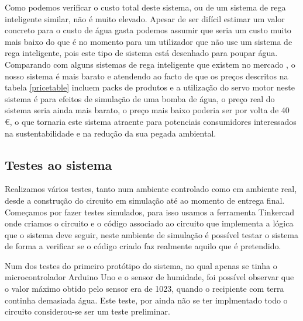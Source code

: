 \documentclass[conference]{IEEEtran}
\begin{document}
Como podemos verificar o custo total deste sistema, ou de um sistema de 
rega inteligente similar, não é muito elevado. Apesar de ser difícil estimar 
um valor concreto para o custo de água gasta podemos assumir que seria um custo 
muito mais baixo do que é no momento para um utilizador que não use um sistema de 
rega inteligente, pois este tipo de sistema está desenhado para poupar água. 
Comparando com alguns sistemas de rega inteligente que existem no 
mercado \cite{amazonOrbit} \cite{amazonNetro}, o nosso sistema é mais barato e 
atendendo ao facto de que os preços descritos na tabela \ref{pricetable} incluem packs de 
produtos e a utilização do servo motor neste sistema é para efeitos de simulação 
de uma bomba de água, o preço real do sistema seria ainda mais barato, o preço mais 
baixo poderia ser por volta de 40 €, o que tornaria este sistema atraente para 
potenciais consumidores interessados na sustentabilidade e na redução da sua pegada 
ambiental.

\subsection{Testes ao sistema}

Realizamos vários testes, tanto num ambiente controlado como em ambiente real, desde 
a construção do circuito em simulação até ao momento de entrega final. Começamos 
por fazer testes simulados, para isso usamos a ferramenta Tinkercad \cite{tinkercad} onde 
criamos o circuito e o código associado ao circuito que implementa a lógica 
que o sistema deve seguir, neste ambiente de simulação é possível testar 
o sistema de forma a verificar se o código criado faz realmente aquilo 
que é pretendido.

Num dos testes do primeiro protótipo do sistema, no qual apenas se tinha o microcontrolador
Arduino Uno e o sensor de humidade, foi possível observar que o valor máximo obtido pelo sensor 
era de 1023, quando o recipiente com terra continha demasiada água. Este teste, por ainda 
não se ter implmentado todo o circuito considerou-se ser um teste preliminar.
\end{document}
